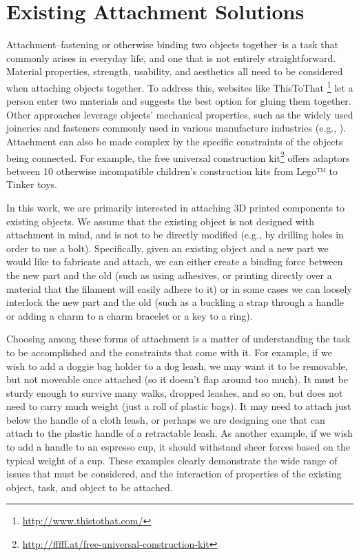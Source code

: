 \section{Existing Attachment Solutions}
Attachment--fastening or otherwise binding two objects together--is a task that commonly arises in everyday life, and one that is not entirely straightforward. Material properties, strength, usability, and aesthetics all need to be considered when attaching objects together. To address this, websites like ThisToThat \footnote{\url{http://www.thistothat.com/}} let a person enter two materials and suggests the best option for gluing them together. Other approaches leverage objects' mechanical properties, such as the widely used joineries and fasteners commonly used in various manufacture industries (e.g., \cite{barrett1990fastener}). Attachment can also be made complex by the specific constraints of the objects being connected. For example, the free universal construction kit\footnote{\url{http://fffff.at/free-universal-construction-kit}} offers adaptors between 10 otherwise incompatible children's construction kits from Lego™ to Tinker toys.

In this work, we are primarily interested in attaching 3D printed components to existing objects. We assume that the existing object is not designed with attachment in mind, and is not to be directly modified (e.g., by drilling holes in order to use a bolt). Specifically, given an existing object and a new part we would like to fabricate and attach, we can either create a binding force between the new part and the old (such as using adhesives, or printing directly over a material that the filament will easily adhere to it) or in some cases we can loosely interlock the new part and the old (such as a buckling a strap through a handle or adding a charm to a charm bracelet or a key to a ring).

Choosing among these forms of attachment is a matter of understanding the task to be accomplished and the constraints that come with it. For example, if we wish to add a doggie bag holder to a dog leash, we may want it to be removable, but not moveable once attached (so it doesn't flap around too much). It must be sturdy enough to survive many walks, dropped leashes, and so on, but does not need to carry much weight (just a roll of plastic bags). It may need to attach just below the handle of a cloth leash, or perhaps we are designing one that can attach to the plastic handle of a retractable leash. As another example, if we wish to add a handle to an espresso cup, it should withstand sheer forces based on the typical weight of a cup. These examples clearly demonstrate the wide range of issues that must be considered, and the interaction of properties of the existing object, task, and object to be attached.

